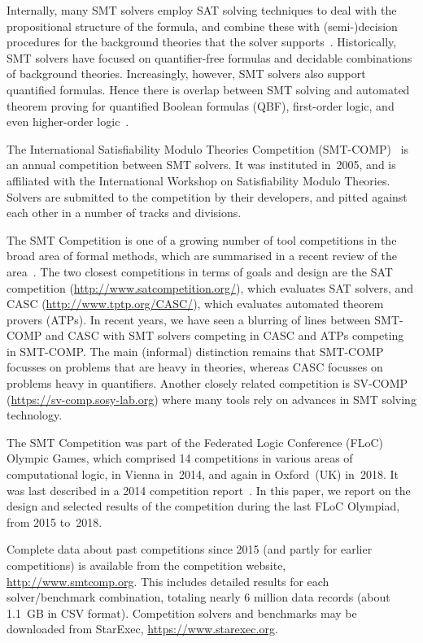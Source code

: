 \documentclass[dvipsnames,table,twoside,11pt]{article}
\begin{document}
Internally, many SMT solvers employ SAT solving techniques to deal
with the propositional structure of the formula, and combine these
with (semi-)decision procedures for the background theories that the
solver
supports~\cite{DBLP:conf/cav/BarrettCDHJKRT11,DBLP:conf/cade/BoutonODF09,DBLP:conf/tacas/MouraB08,Nieuwenhuis:2006:SSS:1217856.1217859}.
Historically, SMT solvers have focused on quantifier-free formulas and
decidable combinations of background theories.  Increasingly, however,
SMT solvers also support quantified formulas.  Hence there is overlap
between SMT solving and automated theorem proving for quantified
Boolean formulas (QBF), first-order logic, and even higher-order
logic~\cite{DBLP:journals/corr/abs-1712-01486}.

The International Satisfiability Modulo Theories Competition
(SMT-COMP)~\cite{BdMS05,BdMS07,BDdMOS13,BDOS08,BDOS10,CDW14,CGBD12} is
an annual competition between SMT solvers.  It was instituted in~2005,
and is affiliated with the International Workshop on Satisfiability
Modulo Theories.  Solvers are submitted to the competition by their
developers, and pitted against each other in a number of tracks and
divisions.

The SMT Competition is one of a growing number of tool competitions in the broad area of formal methods, which are summarised in a recent review of the area~\cite{toolympics}. The two closest competitions in terms of goals and design are the SAT competition (\url{http://www.satcompetition.org/}), which evaluates SAT solvers, and CASC (\url{http://www.tptp.org/CASC/}), which evaluates automated theorem provers (ATPs). In recent years, we have seen a blurring of lines between SMT-COMP and CASC with SMT solvers competing in CASC and ATPs competing in SMT-COMP. The main (informal) distinction remains that SMT-COMP focusses on problems that are heavy in theories, whereas CASC focusses on problems heavy in quantifiers.
Another closely related competition is SV-COMP (\url{https://sv-comp.sosy-lab.org}) where many tools rely on advances in SMT solving technology.

The SMT Competition was part of the Federated Logic
Conference (FLoC) Olympic Games, which comprised 14 competitions in
various areas of computational logic, in Vienna in~2014, and again in
Oxford~(UK) in~2018.  It was last described in a 2014 competition
report~\cite{CDW14}.  In this paper, we report on the design and
selected results of the competition during the last FLoC Olympiad,
from 2015 to~2018.

Complete data about past competitions since 2015 (and partly for
earlier competitions) is available from the competition website,
\url{http://www.smtcomp.org}.  This includes detailed results for each
solver/benchmark combination, totaling nearly 6 million data records
(about 1.1~GB in CSV format).  Competition solvers and benchmarks may
be downloaded from StarExec, \url{https://www.starexec.org}.
\end{document}
